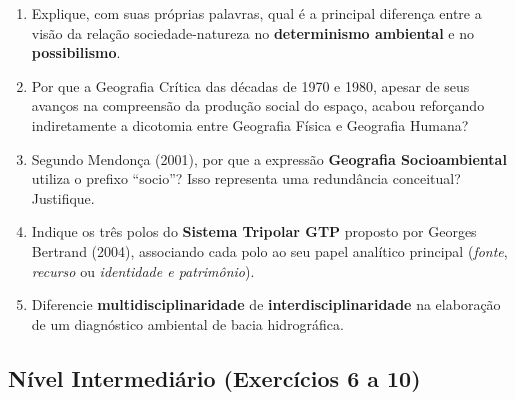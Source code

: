 \begin{enumerate}[leftmargin=1.8em, itemsep=4pt]
  \item Explique, com suas próprias palavras, qual é a principal diferença entre a visão da relação sociedade-natureza no \textbf{determinismo ambiental} e no \textbf{possibilismo}.
  \espacoResolucao[2.0cm]

  \item Por que a Geografia Crítica das décadas de 1970 e 1980, apesar de seus avanços na compreensão da produção social do espaço, acabou reforçando indiretamente a dicotomia entre Geografia Física e Geografia Humana?
  \espacoResolucao[2.0cm]

  \item Segundo Mendonça (2001), por que a expressão \textbf{Geografia Socioambiental} utiliza o prefixo ``socio''? Isso representa uma redundância conceitual? Justifique.
  \espacoResolucao[2.0cm]

  \item Indique os três polos do \textbf{Sistema Tripolar GTP} proposto por Georges Bertrand (2004), associando cada polo ao seu papel analítico principal (\textit{fonte}, \textit{recurso} ou \textit{identidade e patrimônio}).
  \espacoResolucao[2.0cm]

  \item Diferencie \textbf{multidisciplinaridade} de \textbf{interdisciplinaridade} na elaboração de um diagnóstico ambiental de bacia hidrográfica.
  \espacoResolucao[2.0cm]
\end{enumerate}

\subsection*{Nível Intermediário (Exercícios 6 a 10)}

